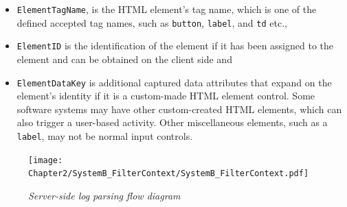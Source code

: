 \begin{itemize}
	\item \texttt{ElementTagName}, is the HTML element's tag name, which is one of the defined accepted tag names, such as \texttt{button}, \texttt{label}, and \texttt{td} etc.,
	\item \texttt{ElementID} is the identification of the element if it has been assigned to the element and can be obtained on the client side and
	\item \texttt{ElementDataKey} is additional captured data attributes that expand on the element's identity if it is a custom-made HTML element control. Some software systems may have other custom-created HTML elements, which can also trigger a user-based activity. Other miscellaneous elements, such as a \texttt{label}, may not be normal input controls.
\end{itemize}

\clearpage

\begin{figure}[!htb]
	\centering
	\texttt{[image: Chapter2/SystemB\_FilterContext/SystemB\_FilterContext.pdf]}
	\caption[Server-side log parsing flow diagram]
	{\textit{Server-side log parsing flow diagram}}\label{fig:ch2_loggingParse}
\end{figure}

\clearpage

